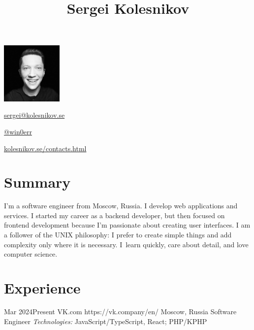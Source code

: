 \documentclass[10pt]{article}
\begin{document}
\begin{floatingfigure}[r]{3cm}
	\vspace{-.5\baselineskip}
	\includegraphics[width=3cm]{userpic}
\end{floatingfigure}

\title{Sergei Kolesnikov}
\vspace{-.5\baselineskip}

\begin{horizontalitemize}
	\item \href{mailto:sergei@kolesnikov.se}{sergei@kolesnikov.se}
	\item \href{https://t.me/win0err}{@win0err}
	\item \href{https://kolesnikov.se/contacts.html}{kolesnikov.se/contacts.html}
\end{horizontalitemize}

\begin{summary}
\end{summary}


\vspace{-2\baselineskip}
\section{Summary}

I'm a software engineer from Moscow, Russia. I develop web applications and services.
I started my career as a backend developer, but then focused on frontend development because I'm passionate about creating user interfaces.
I am a follower of the UNIX philosophy: I prefer to create simple things and add complexity only where it is necessary.
I~learn quickly, care about detail, and love computer science.


\section{Experience}

\job
	{Mar 2024}{Present}
	{VK.com}
	{https://vk.company/en/}  %
	{Moscow, Russia}
	{Software Engineer}
	{
	  \textit{Technologies:} JavaScript/TypeScript, React; PHP/KPHP
	}
\end{document}
